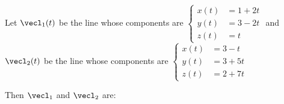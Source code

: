 \documentclass{ximera}
\author{Gregory Hartman \and Matthew Carr}
\begin{document}
\begin{exercise}




Let $\vecl_{1}(t)$ be the line whose components are $\left\{ \begin{aligned}x(t) & =1+2t\\
y(t) & =3-2t\\
z(t) & =t
\end{aligned}
\right.$  and $\vecl_{2}(t)$ be the line whose components are $\left\{ \begin{aligned}x(t) & =3-t\\
y(t) & =3+5t\\
z(t) & =2+7t
\end{aligned}
\right.$

Then $\vecl_{1}$ and $\vecl_{2}$ are: 

\begin{multipleChoice}
\end{multipleChoice}


\end{exercise}
\end{document}
